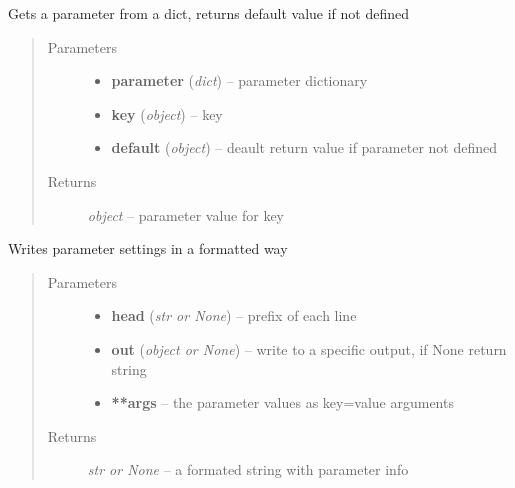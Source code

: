 \documentclass[letterpaper,10pt,english]{sphinxmanual}
\begin{document}
\begin{fulllineitems}
\label{api/ClearMap.Utils:ClearMap.Utils.ParameterTools.getParameter}
Gets a parameter from a dict, returns default value if not defined
\begin{quote}\begin{description}
\item[{Parameters}] \leavevmode\begin{itemize}
\item {} 
\textbf{parameter} (\emph{dict}) --
parameter dictionary

\item {} 
\textbf{key} (\emph{object}) --
key

\item {} 
\textbf{default} (\emph{object}) --
deault return value if parameter not defined

\end{itemize}

\item[{Returns}] \leavevmode
\emph{object} --
parameter value for key

\end{description}\end{quote}

\end{fulllineitems}


\begin{fulllineitems}
\label{api/ClearMap.Utils:ClearMap.Utils.ParameterTools.writeParameter}
Writes parameter settings in a formatted way
\begin{quote}\begin{description}
\item[{Parameters}] \leavevmode\begin{itemize}
\item {} 
\textbf{head} (\emph{str or None}) --
prefix of each line

\item {} 
\textbf{out} (\emph{object or None}) --
write to a specific output, if None return string

\item {} 
\textbf{**args} --
the parameter values as key=value arguments

\end{itemize}

\item[{Returns}] \leavevmode
\emph{str or None} --
a formated string with parameter info

\end{description}\end{quote}

\end{fulllineitems}
\end{document}
